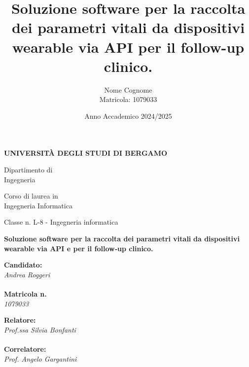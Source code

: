 \documentclass[12pt,a4paper,oneside]{report}
\title{\Huge\textbf{Soluzione software per la raccolta dei parametri vitali da dispositivi wearable via API per il follow-up clinico.}}
\author{Nome Cognome\\Matricola: 1079033}
\date{Anno Accademico 2024/2025}
\begin{document}
\begin{titlepage}
    \begin{center}
        {\fontsize{18}{22}\bfseries UNIVERSITÀ DEGLI STUDI DI BERGAMO}
    \end{center}

    \vspace{1cm}

    \begin{flushleft}
        {\fontsize{14}{18} Dipartimento di}\\
        {\fontsize{14}{18} Ingegneria}

        \vspace{1cm}

        {\fontsize{14}{18} Corso di laurea in}\\
        {\fontsize{14}{18} Ingegneria Informatica}

        \vspace{0.5cm}

        {\fontsize{14}{18} Classe n. L-8 - Ingegneria informatica}
    \end{flushleft}

    \vspace{2.5cm}

    \begin{center}
        {\fontsize{20}{24}\bfseries Soluzione software per la raccolta dei parametri vitali}
        {\fontsize{20}{24}\bfseries da dispositivi wearable via API e per il follow‑up clinico.}
    \end{center}

    \vfill

    \begin{flushleft}
        \begin{minipage}[t]{0.47\textwidth}
            {\fontsize{12}{14}\selectfont\textbf{Candidato:}}\\
            {\fontsize{14}{18}\selectfont\textit{Andrea Roggeri}}\\
            \vspace{0.5cm}\\
            {\fontsize{12}{14}\selectfont\textbf{Matricola n.}}\\
            {\fontsize{14}{18}\selectfont\textit{1079033}}
        \end{minipage}
        \hfill
        \begin{minipage}[t]{0.47\textwidth}
            {\fontsize{12}{14}\selectfont\textbf{Relatore:}}\\
            {\fontsize{14}{18}\selectfont\textit{Prof.ssa Silvia Bonfanti}}\\
            \vspace{0.5cm}\\
            {\fontsize{12}{14}\selectfont\textbf{Correlatore:}}\\
            {\fontsize{14}{18}\selectfont\textit{Prof. Angelo Gargantini}}
        \end{minipage}\end{flushleft}


\end{titlepage}
\end{document}
